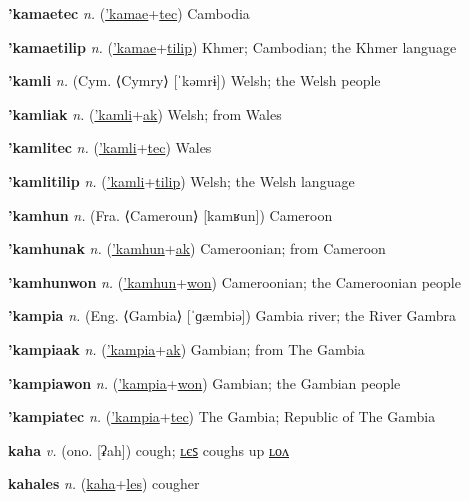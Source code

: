 \textbf{\hypertarget{'kamaetec}{'kamaetec}} \textit{n.} (\hyperlink{'kamae}{'kamae}+\allowbreak \hyperlink{tec}{tec})
Cambodia

\textbf{\hypertarget{'kamaetilip}{'kamaetilip}} \textit{n.} (\hyperlink{'kamae}{'kamae}+\allowbreak \hyperlink{tilip}{tilip})
Khmer; Cambodian; the Khmer language

\textbf{\hypertarget{'kamli}{'kamli}} \textit{n.} (Cym. ⟨Cymry⟩ [ˈkəmrɨ])
Welsh; the Welsh people

\textbf{\hypertarget{'kamliak}{'kamliak}} \textit{n.} (\hyperlink{'kamli}{'kamli}+\allowbreak \hyperlink{ak}{ak})
Welsh; from Wales

\textbf{\hypertarget{'kamlitec}{'kamlitec}} \textit{n.} (\hyperlink{'kamli}{'kamli}+\allowbreak \hyperlink{tec}{tec})
Wales

\textbf{\hypertarget{'kamlitilip}{'kamlitilip}} \textit{n.} (\hyperlink{'kamli}{'kamli}+\allowbreak \hyperlink{tilip}{tilip})
Welsh; the Welsh language

\textbf{\hypertarget{'kamhun}{'kamhun}} \textit{n.} (Fra. ⟨Cameroun⟩ [kamʁun])
Cameroon

\textbf{\hypertarget{'kamhunak}{'kamhunak}} \textit{n.} (\hyperlink{'kamhun}{'kamhun}+\allowbreak \hyperlink{ak}{ak})
Cameroonian; from Cameroon

\textbf{\hypertarget{'kamhunwon}{'kamhunwon}} \textit{n.} (\hyperlink{'kamhun}{'kamhun}+\allowbreak \hyperlink{won}{won})
Cameroonian; the Cameroonian people

\textbf{\hypertarget{'kampia}{'kampia}} \textit{n.} (Eng. ⟨Gambia⟩ [ˈɡæmbiə])
Gambia river; the River Gambra

\textbf{\hypertarget{'kampiaak}{'kampiaak}} \textit{n.} (\hyperlink{'kampia}{'kampia}+\allowbreak \hyperlink{ak}{ak})
Gambian; from The Gambia

\textbf{\hypertarget{'kampiawon}{'kampiawon}} \textit{n.} (\hyperlink{'kampia}{'kampia}+\allowbreak \hyperlink{won}{won})
Gambian; the Gambian people

\textbf{\hypertarget{'kampiatec}{'kampiatec}} \textit{n.} (\hyperlink{'kampia}{'kampia}+\allowbreak \hyperlink{tec}{tec})
The Gambia; Republic of The Gambia

\textbf{\hypertarget{kaha}{kaha}} \textit{v.} (ono. [ʡah])
cough; \hyperlink{kahales}{ʟєꜱ} coughs up \hyperlink{kahalon}{ʟᴏᴧ}

\textbf{\hypertarget{kahales}{kahales}} \textit{n.} (\hyperlink{kaha}{kaha}+\allowbreak \hyperlink{les}{les})
cougher

